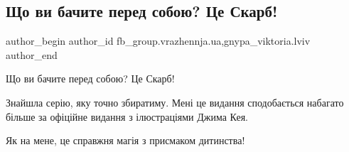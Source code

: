  
 
 
 
 

\subsection{Що ви бачите перед собою? Це Скарб!}
\label{sec:21_01_2023.fb.fb_group.vrazhennja.ua.1.shcho_vi_bachite_per}
 
\ifcmt
 author_begin
   author_id fb_group.vrazhennja.ua,gnypa_viktoria.lviv
 author_end
\fi

Що ви бачите перед собою? Це Скарб!

Знайшла серію, яку точно збиратиму. Мені це видання сподобається набагато
більше за офіційне видання з ілюстраціями Джима Кея.

Як на мене, це справжня магія з присмаком дитинства!


